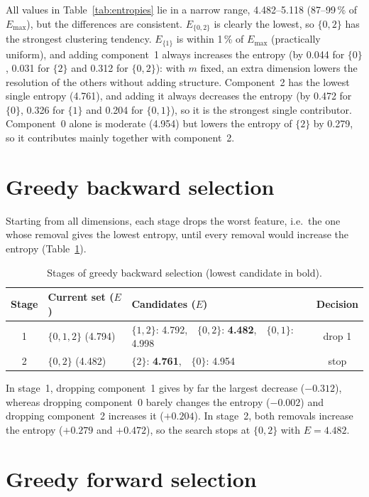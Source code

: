 \documentclass[a4paper,12pt]{article}
\begin{document}
All values in Table~\ref{tab:entropies} lie in a narrow range, 4.482--5.118
(87--99\,\% of $E_{\max}$), but the differences are consistent.
$E_{\{0,2\}}$ is clearly the lowest, so $\{0,2\}$ has the strongest
clustering tendency. $E_{\{1\}}$ is within 1\,\% of $E_{\max}$
(practically uniform), and adding component~1 always increases the entropy
(by 0.044 for $\{0\}$, 0.031 for $\{2\}$ and 0.312 for $\{0,2\}$): with $m$
fixed, an extra dimension lowers the resolution of the others without
adding structure. Component~2 has the lowest single entropy (4.761), and
adding it always decreases the entropy (by 0.472 for $\{0\}$, 0.326 for
$\{1\}$ and 0.204 for $\{0,1\}$), so it is the strongest single
contributor. Component~0 alone is moderate (4.954) but lowers the entropy
of $\{2\}$ by 0.279, so it contributes mainly together with component~2.

\section{Greedy backward selection}

Starting from all dimensions, each stage drops the worst feature, i.e.\ the
one whose removal gives the lowest entropy, until every removal would
increase the entropy (Table~\ref{tab:backward}).

\begin{table}[!ht]
\centering
\caption{Stages of greedy backward selection (lowest candidate in bold).}
\label{tab:backward}
\begin{tabular}{cllc}
\toprule
Stage & Current set ($E$) & Candidates ($E$) & Decision \\
\midrule
1 & $\{0,1,2\}$ (4.794) & $\{1,2\}$: 4.792,\ \ $\{0,2\}$: \textbf{4.482},\ \ $\{0,1\}$: 4.998 & drop 1 \\
2 & $\{0,2\}$ (4.482) & $\{2\}$: \textbf{4.761},\ \ $\{0\}$: 4.954 & stop \\
\bottomrule
\end{tabular}
\end{table}

In stage~1, dropping component~1 gives by far the largest decrease
($-0.312$), whereas dropping component~0 barely changes the entropy
($-0.002$) and dropping component~2 increases it ($+0.204$). In stage~2,
both removals increase the entropy ($+0.279$ and $+0.472$), so the search
stops at $\{0,2\}$ with $E=4.482$.

\section{Greedy forward selection}
\end{document}
